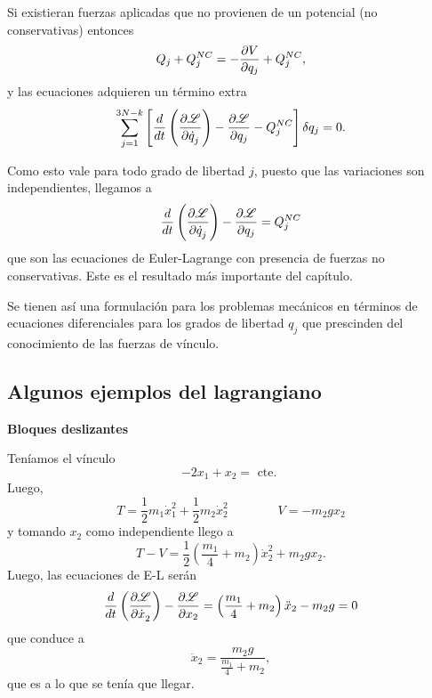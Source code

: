 \documentclass[10pt,oneside]{CBFT_book}
\begin{document}
Si existieran fuerzas aplicadas que no provienen de un potencial (no conservativas) entonces
\[
	Q_j + Q_j^{NC} = -\frac{\partial^{\hspace{-0.05em}} {V}}{\partial {q_j}^{\hspace{-0.05em}}} + Q_j^{NC},
\]
y las ecuaciones adquieren un término extra 
\[
	\sum_{j=1}^{3N-k} \left[
	\frac{d}{dt} \left( \frac{\partial^{\hspace{-0.05em}} {\mathscr{L}}}{\partial {\dot{q}_j}^{\hspace{-0.05em}}} \right) - \frac{\partial^{\hspace{-0.05em}} {\mathscr{L}}}{\partial {q_j}^{\hspace{-0.05em}}} - Q_j^{NC} \right] \delta q_j = 0.
\]

Como esto vale para todo grado de libertad $j$, puesto que las variaciones son independientes, llegamos a
\[
	\frac{d}{dt} \left( \frac{\partial^{\hspace{-0.05em}} {\mathscr{L}}}{\partial {\dot{q}_j}^{\hspace{-0.05em}}} \right) -  \frac{\partial^{\hspace{-0.05em}} {\mathscr{L}}}{\partial {q_j}^{\hspace{-0.05em}}} = Q_j^{NC}
\]
que son las ecuaciones de Euler-Lagrange con presencia de fuerzas no conservativas. 
Este es el resultado más importante del capítulo.

Se tienen así una formulación para los problemas mecánicos en términos de ecuaciones diferenciales para los
grados de libertad $q_j$ que prescinden del conocimiento de las fuerzas de vínculo.

\subsection{Algunos ejemplos del lagrangiano}


\begin{ejemplo}{\bfseries Bloques deslizantes}

Teníamos el vínculo 
\[
	-2x_1 + x_2 = \text{ cte. }
\]
Luego,
\[
	T = \frac 1 2 m_1 \dot{x}_1^2 + \frac 1 2 m_2 \dot{x}_2^2 \qquad \qquad V = -m_2 g x_2
\]
y tomando $x_2$ como independiente llego a
\[
	T-V = \frac{1}{2}\left( \frac{m_1}{4} + m_2 \right) \dot{x}_2^2 + m_2gx_2.
\]
Luego, las ecuaciones de E-L serán
\[
	\frac{d^{\hspace{-0.05em}} {}}{d {t}^{\hspace{-0.05em}}}\left( \frac{\partial^{\hspace{-0.05em}} {\mathscr{L}}}{\partial {\dot{x}_2}^{\hspace{-0.05em}}} \right) - \frac{\partial^{\hspace{-0.05em}} {\mathscr{L}}}{\partial {x_2}^{\hspace{-0.05em}}} =
	\left( \frac{m_1}{4} + m_2 \right) \ddot{x}_2 - m_2 g = 0
\]
que conduce a 
\[
	\ddot{x}_2 = \frac{m_2 g}{\frac{m_1}{4} + m_2 },
\]
que es a lo que se tenía que llegar.
\end{ejemplo}
\end{document}
